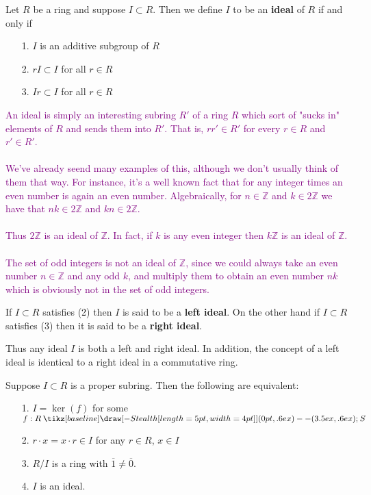 \documentclass[12pt,letterpaper]{algebra_book}
\renewcommand{\to}{\mathbin{\tikz[baseline] \draw[-{Stealth[length=5pt,width=4pt]}] (0pt,.6ex) -- (3.5ex,.6ex);}}
\newcommand{\ZZ}{\mathbb{Z}}
\theoremstyle{definition}
\begin{document}
    \begin{definition}
        Let $R$ be a ring and suppose $I \subset R$. Then we
        define $I$ to be an \textbf{ideal} of $R$ if and only if 
        \begin{itemize}
            \item [1.] $I$ is an additive subgroup of $R$ 
            \item [2.] $rI \subset I$ for all $r \in R$ 
            \item [3.] $Ir \subset I$ for all $r \in R$
        \end{itemize}

        \textcolor{Purple}{An ideal is simply an interesting
        subring $R'$ of a ring $R$ which sort of "sucks in"
        elements of $R$ and sends them into $R'$. That is, $rr'
        \in R'$ for every $r \in R$ and $r' \in R'$.
        \\
        \\
        We've already seend many examples of this, although we
        don't usually think of them that way. For instance, it's
        a well known fact that for any integer times an even
        number is again an even number. Algebraically, for $n \in \ZZ$
        and $k \in 2\ZZ$ we have that $nk \in 2\ZZ$ and $kn \in
        2\ZZ$. 
        \\
        \\
        Thus $2\ZZ$ is an ideal of $\ZZ$. In fact, if $k$ is any
        even integer then $k\ZZ$ is an ideal of $\ZZ$.
        \\
        \\
        The set of odd integers is not an ideal of $\ZZ$, since we
        could always take an even number $n \in \ZZ$ and any odd
        $k$, and multiply them to obtain an even number $nk$ which
        is obviously not in the set of odd integers.
        }


        If $I \subset R$ satisfies (2) then $I$ is
        said to be a \textbf{left ideal}. On the other hand if $I
        \subset R$ satisfies (3) then it is said to be a
        \textbf{right ideal}. 
    \end{definition}

    Thus any ideal $I$ is both a left and right ideal. In
    addition, the concept of a left ideal is identical to a right
    ideal in a commutative ring.  

    \begin{thm} 
        Suppose $I \subset R$ is a proper subring. Then the
        following are equivalent:
        \begin{itemize}
            \item[1.] $I = \ker(f)$ for some $f: R \to S$
            \item[2.] $r\cdot x = x \cdot r \in I$ for any $r \in
            R$, $x \in I$ 
            \item[3.] $R/I$ is a ring with $\overline{1} \ne \overline{0}$. 
            \item[4.] $I$ is an ideal.  
        \end{itemize}
    \end{thm}
\end{document}
